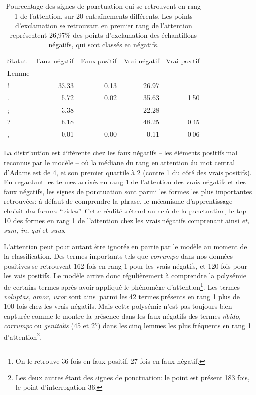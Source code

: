 \begin{table}[]
    \centering
    \begin{tabular}{l|rrrr}
    \toprule
    Statut &  Faux négatif & Faux positif &  Vrai négatif & Vrai positif \\
    Lemme &               &              &               &              \\
    \midrule
    !     &         33.33 &         0.13 &         26.97 &              \\
    .     &          5.72 &         0.02 &         35.63 &         1.50 \\
    ;     &          3.38 &              &         22.28 &              \\
    ?     &          8.18 &              &         48.25 &         0.45 \\
    ,     &          0.01 &         0.00 &          0.11 &         0.06 \\
    \bottomrule
    \end{tabular}
    \caption{Pourcentage des signes de ponctuation qui se retrouvent en rang 1 de l'attention, sur 20 entraînements différents. Les points d'exclamation se retrouvant en premier rang de l'attention représentent 26,97\% des points d'exclamation des échantillons négatifs, qui sont classés en négatifs.}
    \label{tab:chap4:ponctuation-attention}
\end{table}

La distribution est différente chez les faux négatifs -- les éléments positifs mal reconnus par le modèle -- où la médiane du rang en attention du mot central d'Adams est de 4, et son premier quartile à 2 (contre 1 du côté des vrais positifs). En regardant les termes arrivés en rang 1 de l'attention des vrais négatifs et des faux négatifs, les signes de ponctuation sont parmi les formes les plus importantes retrouvées: à défaut de comprendre la phrase, le mécanisme d'apprentissage choisit des formes \enquote{vides}. Cette réalité s'étend au-delà de la ponctuation, le top 10 des formes en rang 1 de l'attention chez les vrais négatifs comprenant ainsi \textit{et, sum, in, qui} et \textit{suus}. 

L'attention peut pour autant être ignorée en partie par le modèle au moment de la classification. Des termes importants tels que \textit{corrumpo} dans nos données positives se retrouvent 162 fois en rang 1 pour les vrais négatifs, et 120 fois pour les vais positifs. Le modèle arrive donc régulièrement à comprendre la polysémie de certains termes après avoir appliqué le phénomène d'attention\footnote{On le retrouve 36 fois en faux positif, 27 fois en faux négatif.}. Les termes \textit{voluptas, amor, uxor} sont ainsi parmi les 42 termes présents en rang 1 plus de 100 fois chez les vrais négatifs. Mais cette polysémie n'est pas toujours bien capturée comme le montre la présence dans les faux négatifs des termes \textit{libido, corrumpo} ou \textit{genitalis} (45 et 27) dans les cinq lemmes les plus fréquents en rang 1 d'attention\footnote{Les deux autres étant des signes de ponctuation: le point est présent 183 fois, le point d'interrogation 36.}.

